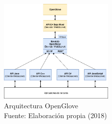   \begin{figure}[H]
  \begin{center} 
   	\includegraphics[width=0.5\textwidth]{images/fig-arquitectura/Legacy-OpenGlove-Architecture-02.png} 
    \caption[Arquitectura OpenGlove]{Arquitectura OpenGlove \\Fuente: Elaboración propia (2018)}
    \label{fig:arquitectura-open-glove}
  \end{center}
\end{figure}

